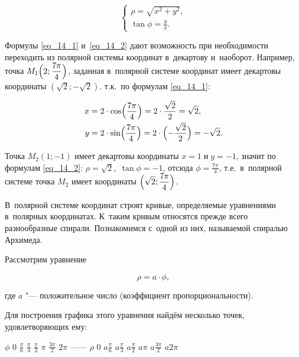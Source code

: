 \begin{equation}\label{eq_14_2}
\begin{cases}
\rho = \sqrt{x^{2} + y^{2}}, \\
\displaystyle \tan \phi = \frac{y}{x}.
\end{cases}
\end{equation}

Формулы \eqref{eq_14_1} и~\eqref{eq_14_2} дают возможность при необходимости
переходить из полярной системы координат в~декартову и~наоборот.
Например, точка $\displaystyle M_{1} \Bigl(2; \frac{7\pi}{4} \Bigr)$, заданная в~полярной системе
координат имеет декартовы координаты $(\sqrt{2}; -\sqrt{2})$.
т.к.\ по формулам \eqref{eq_14_1}:

\begin{align*}
\displaystyle x &= 2 \cdot \cos \Bigl( \frac{7\pi}{4} \Bigr) =
2 \cdot \frac{\sqrt{2}}{2} = \sqrt{2}, \\
\displaystyle y &= 2 \cdot \sin \Bigl( \frac{7\pi}{4} \Bigr) =
2 \cdot \Bigl( -\frac{\sqrt{2}}{2} \Bigr) = -\sqrt{2}. \\
\end{align*}

Точка $M_{2}(1; -1)$ имеет декартовы координаты
$x = 1 \; \text{и} \; y = -1$,
значит по формулам \eqref{eq_14_2}:
$\rho = \sqrt{2}, \; \tan \phi = -1$,
отсюда
$\displaystyle \phi = \frac{7\pi}{4}$,
т.е.\ в~полярной системе точка $M_{2}$ имеет координаты 
$\displaystyle \Bigl( \sqrt{2}; \frac{7\pi}{4} \Bigr)$.

В~полярной системе координат строят кривые, определяемые уравнениями в~полярных
координатах. К~таким кривым относятся прежде всего разнообразные спирали.
Познакомимся с~одной из них, называемой спиралью Архимеда.

Рассмотрим уравнение

\begin{equation*}\label{eq_14_3}
\rho = a \cdot \phi,
\end{equation*}

где $a$ "--- положительное число (коэффициент пропорциональности).

Для построения графика этого уравнения найдём несколько точек,
удовлетворяющих ему:

$\phi$
0
$\displaystyle \frac{\pi}{6}$
$\displaystyle \frac{\pi}{3}$
$\displaystyle \frac{\pi}{2}$
$\pi$
$\displaystyle \frac{3\pi}{2}$
$2\pi$
------
$\rho$
0
$\displaystyle a\frac{\pi}{6}$
$\displaystyle a\frac{\pi}{3}$
$\displaystyle a\frac{\pi}{2}$
$a\pi$
$\displaystyle a\frac{3\pi}{2}$
$a2\pi$

